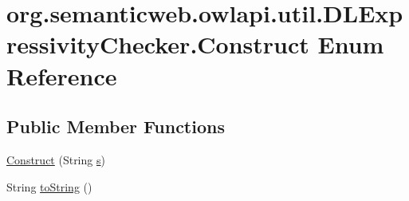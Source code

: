 \hypertarget{enumorg_1_1semanticweb_1_1owlapi_1_1util_1_1_d_l_expressivity_checker_1_1_construct}{\section{org.\-semanticweb.\-owlapi.\-util.\-D\-L\-Expressivity\-Checker.\-Construct Enum Reference}
\label{enumorg_1_1semanticweb_1_1owlapi_1_1util_1_1_d_l_expressivity_checker_1_1_construct}
}
\subsection*{Public Member Functions}
\begin{DoxyCompactItemize}
\item 
\hyperlink{enumorg_1_1semanticweb_1_1owlapi_1_1util_1_1_d_l_expressivity_checker_1_1_construct_a70aa3dcf64c6b5d43fa4ea0901bd43d1}{Construct} (String \hyperlink{enumorg_1_1semanticweb_1_1owlapi_1_1util_1_1_d_l_expressivity_checker_1_1_construct_a92618efe123a0f0af44e8fd78c66fef9}{s})
\item 
String \hyperlink{enumorg_1_1semanticweb_1_1owlapi_1_1util_1_1_d_l_expressivity_checker_1_1_construct_a2e9c231549e02f002e7aa4d5b0f4dda7}{to\-String} ()
\end{DoxyCompactItemize}

